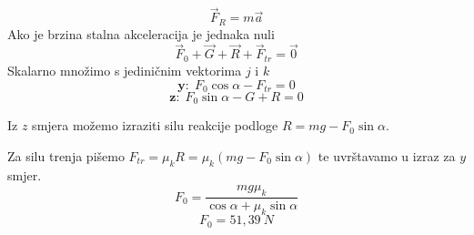 

$$ \vec{F}_R=m\vec{a}$$
Ako je brzina stalna akceleracija je jednaka nuli
$$\vec{F}_0+\vec{G}+\vec{R}+\vec{F}_{tr}=\vec{0} $$
Skalarno množimo s jediničnim vektorima $j$ i $k$
$$ \textbf{y:}\ \  F_0\cos\alpha -F_{tr}=0 $$
$$  \textbf{z:}\ \ F_0\sin\alpha-G + R =0$$

Iz $z$ smjera možemo izraziti silu reakcije podloge
$R=mg-F_0\sin\alpha$.
 
Za silu trenja pišemo $F_{tr}=\mu_k R=\mu_k (mg-F_0\sin\alpha)$ te uvrštavamo u izraz za $y$ smjer.
$$
F_0=\frac{mg\mu_k}{\cos\alpha+\mu_k\sin\alpha}
$$
$$
F_0=51,39\ N
$$

